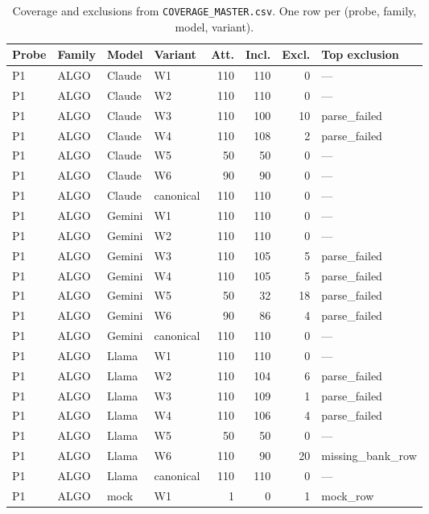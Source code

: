 \begin{table}[t]
  \centering
  \scriptsize
  \setlength{\tabcolsep}{2.5pt}
  \caption{Coverage and exclusions from \texttt{COVERAGE\_MASTER.csv}.
  One row per (probe, family, model, variant).}
  \label{tab:coverage}
  \begin{tabular}{llllrrrl}
    \toprule
    Probe & Family & Model & Variant & Att. & Incl. & Excl. & Top exclusion \\
    \midrule
    P1 & ALGO & Claude & W1 & 110 & 110 & 0 & --- \\
    P1 & ALGO & Claude & W2 & 110 & 110 & 0 & --- \\
    P1 & ALGO & Claude & W3 & 110 & 100 & 10 & parse\_failed \\
    P1 & ALGO & Claude & W4 & 110 & 108 & 2 & parse\_failed \\
    P1 & ALGO & Claude & W5 & 50 & 50 & 0 & --- \\
    P1 & ALGO & Claude & W6 & 90 & 90 & 0 & --- \\
    P1 & ALGO & Claude & canonical & 110 & 110 & 0 & --- \\
    P1 & ALGO & Gemini & W1 & 110 & 110 & 0 & --- \\
    P1 & ALGO & Gemini & W2 & 110 & 110 & 0 & --- \\
    P1 & ALGO & Gemini & W3 & 110 & 105 & 5 & parse\_failed \\
    P1 & ALGO & Gemini & W4 & 110 & 105 & 5 & parse\_failed \\
    P1 & ALGO & Gemini & W5 & 50 & 32 & 18 & parse\_failed \\
    P1 & ALGO & Gemini & W6 & 90 & 86 & 4 & parse\_failed \\
    P1 & ALGO & Gemini & canonical & 110 & 110 & 0 & --- \\
    P1 & ALGO & Llama & W1 & 110 & 110 & 0 & --- \\
    P1 & ALGO & Llama & W2 & 110 & 104 & 6 & parse\_failed \\
    P1 & ALGO & Llama & W3 & 110 & 109 & 1 & parse\_failed \\
    P1 & ALGO & Llama & W4 & 110 & 106 & 4 & parse\_failed \\
    P1 & ALGO & Llama & W5 & 50 & 50 & 0 & --- \\
    P1 & ALGO & Llama & W6 & 110 & 90 & 20 & missing\_bank\_row \\
    P1 & ALGO & Llama & canonical & 110 & 110 & 0 & --- \\
    P1 & ALGO & mock & W1 & 1 & 0 & 1 & mock\_row \\

\end{tabular}
\end{table}

